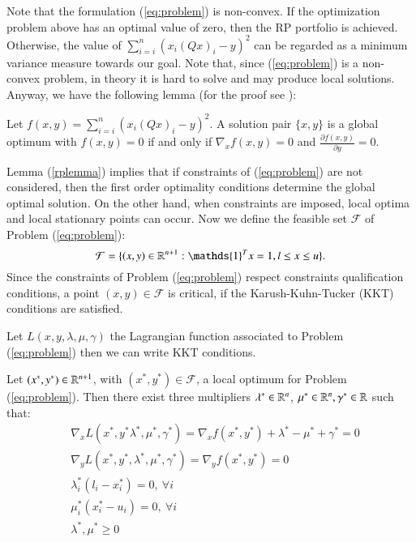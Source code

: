 Note that the formulation (\ref{eq:problem}) is non-convex.  If the optimization problem above has an optimal value of zero, then the RP portfolio is achieved. Otherwise, the value of $\sum_{i=i}^n \left( x_i(Q x)_i - y\right)^2$  can be regarded as a minimum variance measure towards our goal. Note that, since (\ref{eq:problem}) is a non-convex problem, in theory it is hard to solve and may produce local solutions. Anyway, we have the following lemma (for the proof see \cite{tutuncu}):
\begin{lemma}\label{rplemma}
Let $f(x,y) = \sum_{i=i}^n \left( x_i(Q x)_i - y \right)^2$. A solution pair $\{x,y\}$ is a global optimum with $f(x,y)=0$ if and only if $\nabla_xf(x,y) = 0$ and $\frac{\partial f(x,y)}{\partial y} = 0$.
\end{lemma}
Lemma (\ref{rplemma}) implies that if constraints of (\ref{eq:problem}) are not considered, then the first order optimality conditions determine the global optimal solution. On the other hand, when constraints are imposed, local optima and local stationary points can occur.
Now we define the feasible set $\mathcal{F}$  of Problem (\ref{eq:problem}):
\begin{equation}
\mathcal{F} = \{(x,y) \in \R^{n+1} : \mathds{1}^T x = 1, l \leq x \leq u\}.
\end{equation}
Since the constraints of Problem (\ref{eq:problem}) respect constraints qualification conditions, a point $(x,y) \in \mathcal{F}$ is critical, if the Karush-Kuhn-Tucker (KKT) conditions are satisfied.

Let $L(x,y,\lambda,\mu,\gamma)$ the Lagrangian function associated to Problem (\ref{eq:problem}) then we can write KKT conditions.

\begin{proposition}\label{prop:KKT}

Let $(x^*,y^*) \in \mathbb{R}^{n+1}$, with $(x^*,y^*) \in \mathcal{F}$, a local optimum for Problem (\ref{eq:problem}). Then there exist three multipliers $\lambda^* \in \mathbb{R}^n$, $\mu^* \in \mathbb{R}^n, \gamma^* \in \mathbb{R}$ such that:
\begin{equation}
 \begin{aligned}
  &\nabla_x L(x^*,y^*\lambda^*,\mu^*,\gamma^*)= \nabla_x f(x^*,y^*)+\lambda^*-\mu^*+\gamma^*=0\\
 &\nabla_y L(x^*,y^*,\lambda^*,\mu^*,\gamma^*)=\nabla_y f(x^*,y^*) =0 \\
    &\lambda^*_i(l_i-x_i^*)=0,\ \forall i\\
 &\mu^*_i(x_i^*-u_i)=0,\ \forall i\\
   & \lambda^*,\mu^*\ge0 \\
 \end{aligned}
\end{equation}
\end{proposition}

